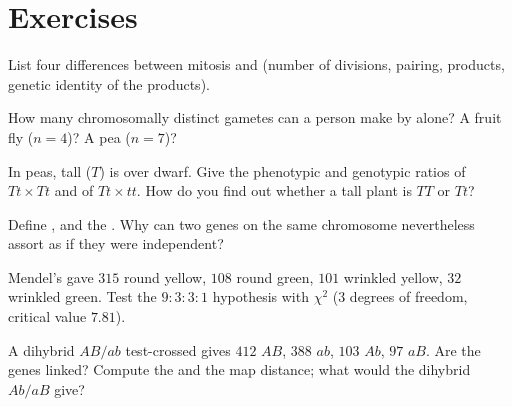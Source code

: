 \section{Exercises}

\begin{exercise}[$\star$]\label{exo:b2:meiosis-heredity:1}
List four differences between mitosis and  (number of
divisions, pairing, products, genetic identity of the products).
\end{exercise}

\begin{exercise}[$\star$]\label{exo:b2:meiosis-heredity:2}
How many chromosomally distinct gametes can a person make by
 alone? A fruit fly ($n = 4$)? A pea ($n =
7$)?
\end{exercise}

\begin{exercise}[$\star$]\label{exo:b2:meiosis-heredity:3}
In peas, tall ($T$) is  over dwarf. Give the phenotypic and
genotypic ratios of $Tt \times Tt$ and of $Tt \times tt$. How do you
find out whether a tall plant is $TT$ or $Tt$?
\end{exercise}

\begin{exercise}[$\star$]\label{exo:b2:meiosis-heredity:4}
Define ,  and the . Why
can two genes on the same chromosome nevertheless assort as if they
were independent?
\end{exercise}

\begin{exercise}[$\star\star$]\label{exo:b2:meiosis-heredity:5}
Mendel's  gave $315$ round yellow, $108$ round green,
$101$ wrinkled yellow, $32$ wrinkled green. Test the $9 : 3 : 3 :
1$ hypothesis with $\chi^2$ (3 degrees of freedom, critical value
$7.81$).
\end{exercise}

\begin{exercise}[$\star\star$]\label{exo:b2:meiosis-heredity:6}
A dihybrid $AB/ab$ test-crossed gives $412$ $AB$, $388$ $ab$, $103$
$Ab$, $97$ $aB$. Are the genes linked? Compute the  and the map distance; what would the dihybrid $Ab/aB$ give?
\end{exercise}

